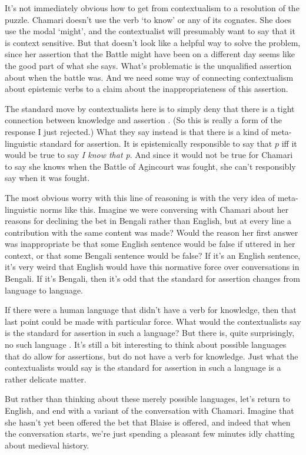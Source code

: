 \documentclass[11pt,]{book}
\begin{document}
It's not immediately obvious how to get from contextualism to a resolution of the puzzle. Chamari doesn't use the verb `to know' or any of its cognates. She does use the modal `might', and the contextualist will presumably want to say that it is context sensitive. But that doesn't look like a helpful way to solve the problem, since her assertion that the Battle might have been on a different day seems like the good part of what she says. What's problematic is the unqualified assertion about when the battle was. And we need some way of connecting contextualism about epistemic verbs to a claim about the inappropriateness of this assertion.

The standard move by contextualists here is to simply deny that there is a tight connection between knowledge and assertion \citep{DeRose2002, Cohen2004}. (So this is really a form of the response I just rejected.) What they say instead is that there is a kind of meta-linguistic standard for assertion. It is epistemically responsible to say that \(p\) iff it would be true to say \emph{I know that p}. And since it would not be true for Chamari to say she knows when the Battle of Agincourt was fought, she can't responsibly say when it was fought.

The most obvious worry with this line of reasoning is with the very idea of meta-linguistic norms like this. Imagine we were conversing with Chamari about her reasons for declining the bet in Bengali rather than English, but at every line a contribution with the same content was made? Would the reason her first answer was inappropriate be that some English sentence would be false if uttered in her context, or that some Bengali sentence would be false? If it's an English sentence, it's very weird that English would have this normative force over conversations in Bengali. If it's Bengali, then it's odd that the standard for assertion changes from language to language.

If there were a human language that didn't have a verb for knowledge, then that last point could be made with particular force. What would the contextualists say is the standard for assertion in such a language? But there is, quite surprisingly, no such language \citep{Nagel2014}. It's still a bit interesting to think about possible languages that do allow for assertions, but do not have a verb for knowledge. Just what the contextualists would say is the standard for assertion in such a language is a rather delicate matter.

But rather than thinking about these merely possible languages, let's return to English, and end with a variant of the conversation with Chamari. Imagine that she hasn't yet been offered the bet that Blaise is offered, and indeed that when the conversation starts, we're just spending a pleasant few minutes idly chatting about medieval history.
\end{document}
